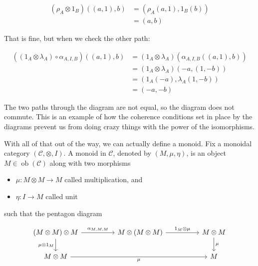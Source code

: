 \documentclass{article}
\begin{document}
\begin{equation*}
  \begin{split}
    (\rho_A \otimes 1_B)((a, 1), b)
      & = (\rho_A(a, 1), 1_B(b)) \\
      & = (a, b)
  \end{split}
\end{equation*}

That is fine, but when we check the other path:

\begin{equation*}
  \begin{split}
    ((1_A \otimes \lambda_A) \circ \alpha_{A, I, B})((a, 1), b)
      & = (1_A \otimes \lambda_A)(\alpha_{A, I, B}((a, 1), b)) \\
      & = (1_A \otimes \lambda_A)(-a, (1, -b)) \\
      & = (1_A(-a), \lambda_A(1, -b)) \\
      & = (-a, -b)
  \end{split}
\end{equation*}

The two paths through the diagram are not equal, so the diagram does not
commute. This is an example of how the coherence conditions set in place by the
diagrams prevent us from doing crazy things with the power of the isomorphisms.

With all of that out of the way, we can actually define a monoid. Fix a
monoidal category $(\mathcal{C}, \otimes, I)$. A monoid in $\mathcal{C}$,
denoted by $(M, \mu, \eta)$, is an object $M \in
\operatorname{ob}(\mathcal{C})$ along with two morphisms

\begin{itemize}
  \item $\mu : M \otimes M \to M$ called multiplication, and
  \item $\eta : I \to M$ called unit
\end{itemize}

such that the pentagon diagram

\begin{equation*}
  \begin{tikzcd}
    (M \otimes M) \otimes M \arrow[d, "\mu \otimes 1_M"'] \arrow[rr, "{\alpha_{M, M, M}}"] &  & M \otimes (M \otimes M) \arrow[rr, "1_M \otimes \mu"] &  & M \otimes M \arrow[d, "\mu"] \\
    M \otimes M \arrow[rrrr, "\mu"']                                                       &  &                                                       &  & M
  \end{tikzcd}
\end{equation*}
\end{document}
